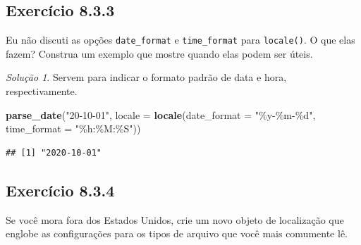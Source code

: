 \documentclass[
]{latex/krantz}
\newenvironment{Shaded}{\begin{snugshade}}{\end{snugshade}}
\newcommand{\AttributeTok}[1]{\textcolor[rgb]{0.13,0.29,0.53}{#1}}
\newcommand{\FunctionTok}[1]{\textcolor[rgb]{0.13,0.29,0.53}{\textbf{#1}}}
\newcommand{\NormalTok}[1]{#1}
\newcommand{\StringTok}[1]{\textcolor[rgb]{0.31,0.60,0.02}{#1}}
\theoremstyle{definition}
\theoremstyle{definition}
\theoremstyle{definition}
\theoremstyle{definition}
\theoremstyle{remark}
\newtheorem*{solution}{Solução}
\begin{document}
\hypertarget{exr8-3-3}{%
\subsection*{Exercício 8.3.3}\label{exr8-3-3}}

Eu não discuti as opções \texttt{date\_format} e \texttt{time\_format} para \texttt{locale()}. O que elas fazem? Construa um exemplo que mostre quando elas podem ser úteis.

\begin{solution}

Servem para indicar o formato padrão de data e hora, respectivamente.

\begin{Shaded}
\begin{Highlighting}[]
\FunctionTok{parse\_date}\NormalTok{(}\StringTok{"20{-}10{-}01"}\NormalTok{, }\AttributeTok{locale =} \FunctionTok{locale}\NormalTok{(}\AttributeTok{date\_format =} \StringTok{"\%y{-}\%m{-}\%d"}\NormalTok{, }\AttributeTok{time\_format =} \StringTok{"\%h:\%M:\%S"}\NormalTok{))}
\end{Highlighting}
\end{Shaded}

\begin{verbatim}
## [1] "2020-10-01"
\end{verbatim}

\end{solution}

\hypertarget{exr8-3-4}{%
\subsection*{Exercício 8.3.4}\label{exr8-3-4}}

Se você mora fora dos Estados Unidos, crie um novo objeto de localização que englobe as configurações para os tipos de arquivo que você mais comumente lê.
\end{document}

